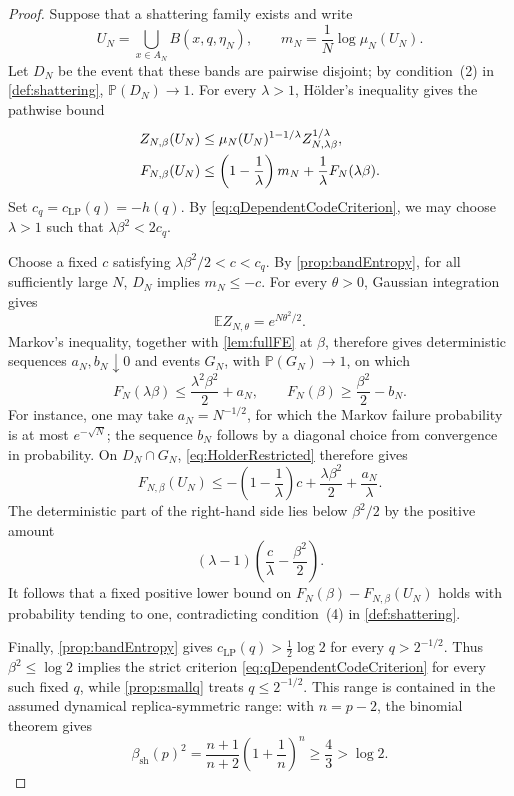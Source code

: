 \documentclass[11pt,reqno]{amsart}
\numberwithin{equation}{section}
\theoremstyle{plain}
\theoremstyle{definition}
\theoremstyle{remark}
\newcommand{\E}{\mathbb E}
\newcommand{\Pp}{\mathbb P}
\newcommand{\1}{\mathbf 1}
\begin{document}
\begin{proof}
Suppose that a shattering family exists and write
\[
 U_N=\bigcup_{x\in A_N}B(x,q,\eta_N),
 \qquad m_N=\frac1N\log\mu_N(U_N).
\]
Let \(D_N\) be the event that these bands are pairwise disjoint; by
condition~\textup{(2)} in \cref{def:shattering},
\(\Pp(D_N)\to1\).
For every \(\lambda>1\), H\"older's inequality gives the pathwise bound
\begin{align}
 Z_{N,\beta}(U_N)
 &\leq \mu_N(U_N)^{1-1/\lambda}
       Z_{N,\lambda\beta}^{1/\lambda},\notag\\
 F_{N,\beta}(U_N)
 &\leq\left(1-\frac1\lambda\right)m_N
       +\frac1\lambda F_N(\lambda\beta).
 \label{eq:HolderRestricted}
\end{align}
Set \(c_q=c_{\mathrm{LP}}(q)=-h(q)\).  By
\eqref{eq:qDependentCodeCriterion}, we may choose \(\lambda>1\) such
that \(\lambda\beta^2<2c_q\).

Choose a fixed \(c\) satisfying \(\lambda\beta^2/2<c<c_q\).  By
\cref{prop:bandEntropy}, for all sufficiently large \(N\),
\(D_N\) implies \(m_N\leq-c\).
For every \(\theta>0\), Gaussian integration gives
\[
 \E Z_{N,\theta}=e^{N\theta^2/2}.
\]
Markov's inequality, together with \cref{lem:fullFE} at \(\beta\),
therefore gives deterministic sequences \(a_N,b_N\downarrow0\) and
events \(G_N\), with \(\Pp(G_N)\to1\), on which
\[
 F_N(\lambda\beta)\leq\frac{\lambda^2\beta^2}{2}+a_N,
 \qquad
 F_N(\beta)\geq\frac{\beta^2}{2}-b_N.
\]
For instance, one may take \(a_N=N^{-1/2}\), for which the Markov
failure probability is at most \(e^{-\sqrt N}\); the sequence \(b_N\)
follows by a diagonal choice from convergence in probability.
On \(D_N\cap G_N\), \eqref{eq:HolderRestricted} therefore gives
\[
 F_{N,\beta}(U_N)
 \leq-\left(1-\frac1\lambda\right)c
       +\frac{\lambda\beta^2}{2}+\frac{a_N}{\lambda}.
\]
The deterministic part of the right-hand side lies below
\(\beta^2/2\) by the positive amount
\[
 (\lambda-1)\left(\frac c\lambda-\frac{\beta^2}{2}\right).
\]
It follows that a fixed positive lower bound on
\(F_N(\beta)-F_{N,\beta}(U_N)\) holds with probability tending to
one, contradicting condition~\textup{(4)} in \cref{def:shattering}.

Finally, \cref{prop:bandEntropy} gives
\(c_{\mathrm{LP}}(q)>\frac12\log2\) for every
\(q>2^{-1/2}\).  Thus \(\beta^2\leq\log2\) implies the strict
criterion \eqref{eq:qDependentCodeCriterion} for every such fixed
\(q\), while \cref{prop:smallq} treats \(q\leq2^{-1/2}\).  This range
is contained in the assumed dynamical replica-symmetric range: with \(n=p-2\),
the binomial theorem gives
\[
 \beta_{\mathrm{sh}}(p)^2
 =\frac{n+1}{n+2}\left(1+\frac1n\right)^n
 \geq\frac43>\log2.
\]
\end{proof}
\end{document}
